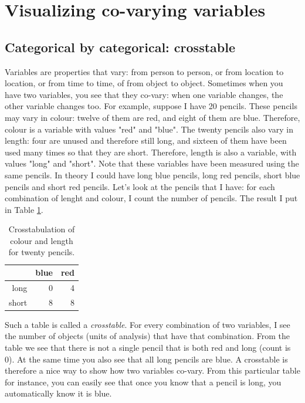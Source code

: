 \documentclass[]{report}\usepackage[]{graphicx}\usepackage[]{color}
\begin{document}
\section{Visualizing co-varying variables}

\subsection{Categorical by categorical: crosstable}

Variables are properties that vary: from person to person, or from location to location, or from time to time, of from object to object. Sometimes when you have two variables, you see that they co-vary: when one variable changes, the other variable changes too. For example, suppose I have 20 pencils. These pencils may vary in colour: twelve of them are red, and eight of them are blue. Therefore, colour is a variable with values "red" and "blue". The twenty pencils also vary in length: four are unused and therefore still long, and sixteen of them have been used many times so that they are short. Therefore, length is also a variable, with values "long" and "short". Note that these variables have been measured using the same pencils. In theory I could have long blue pencils, long red pencils, short blue pencils and short red pencils. Let's look at the pencils that I have: for each combination of lenght and colour, I count the number of pencils. The result I put in Table \ref{tab:crosstable_1}.

\begin{table}[ht]
\centering
\caption{Crosstabulation of colour and length for twenty pencils.} 
\label{tab:crosstable_1}
\begin{tabular}{rrr}
  \hline
 & blue & red \\ 
  \hline
long & 0 & 4 \\ 
  short & 8 & 8 \\ 
   \hline
\end{tabular}
\end{table}


Such a table is called a \textit{crosstable}. For every combination of two variables, I see the number of objects (units of analysis) that have that combination. From the table we see that there is not a single pencil that is both red and long (count is 0). At the same time you also see that all long pencils are blue. A crosstable is therefore a nice way to show how two variables co-vary. From this particular table for instance, you can easily see that once you know that a pencil is long, you automatically know it is blue.
\end{document}
